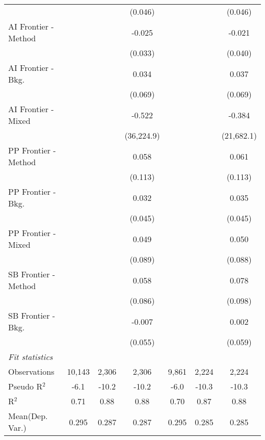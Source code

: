 \begin{tabular}{lcccccc}
                        &                &         & (0.046)    &                &         & (0.046)\\   
   AI Frontier - Method &                &         & -0.025     &                &         & -0.021\\   
                        &                &         & (0.033)    &                &         & (0.040)\\   
   AI Frontier - Bkg.   &                &         & 0.034      &                &         & 0.037\\   
                        &                &         & (0.069)    &                &         & (0.069)\\   
   AI Frontier - Mixed  &                &         & -0.522     &                &         & -0.384\\   
                        &                &         & (36,224.9) &                &         & (21,682.1)\\   
   PP Frontier - Method &                &         & 0.058      &                &         & 0.061\\   
                        &                &         & (0.113)    &                &         & (0.113)\\   
   PP Frontier - Bkg.   &                &         & 0.032      &                &         & 0.035\\   
                        &                &         & (0.045)    &                &         & (0.045)\\   
   PP Frontier - Mixed  &                &         & 0.049      &                &         & 0.050\\   
                        &                &         & (0.089)    &                &         & (0.088)\\   
   SB Frontier - Method &                &         & 0.058      &                &         & 0.078\\   
                        &                &         & (0.086)    &                &         & (0.098)\\   
   SB Frontier - Bkg.   &                &         & -0.007     &                &         & 0.002\\   
                        &                &         & (0.055)    &                &         & (0.059)\\   
   \midrule
   \emph{Fit statistics}\\
   Observations         & 10,143         & 2,306   & 2,306      & 9,861          & 2,224   & 2,224\\  
   Pseudo R$^2$         & -6.1           & -10.2   & -10.2      & -6.0           & -10.3   & -10.3\\  
   R$^2$                & 0.71           & 0.88    & 0.88       & 0.70           & 0.87    & 0.88\\  
Mean(Dep. Var.) & 0.295 & 0.287 & 0.287 & 0.295 & 0.285 & 0.285 \\
   

\end{tabular}
